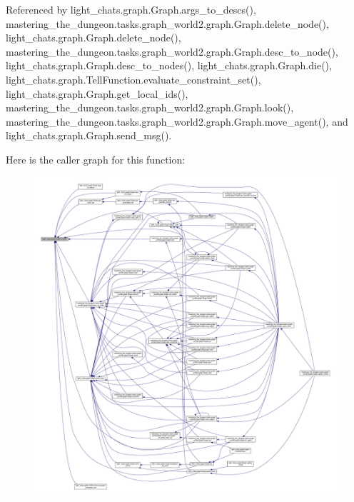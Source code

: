 Referenced by light\+\_\+chats.\+graph.\+Graph.\+args\+\_\+to\+\_\+descs(), mastering\+\_\+the\+\_\+dungeon.\+tasks.\+graph\+\_\+world2.\+graph.\+Graph.\+delete\+\_\+node(), light\+\_\+chats.\+graph.\+Graph.\+delete\+\_\+node(), mastering\+\_\+the\+\_\+dungeon.\+tasks.\+graph\+\_\+world2.\+graph.\+Graph.\+desc\+\_\+to\+\_\+node(), light\+\_\+chats.\+graph.\+Graph.\+desc\+\_\+to\+\_\+nodes(), light\+\_\+chats.\+graph.\+Graph.\+die(), light\+\_\+chats.\+graph.\+Tell\+Function.\+evaluate\+\_\+constraint\+\_\+set(), light\+\_\+chats.\+graph.\+Graph.\+get\+\_\+local\+\_\+ids(), mastering\+\_\+the\+\_\+dungeon.\+tasks.\+graph\+\_\+world2.\+graph.\+Graph.\+look(), mastering\+\_\+the\+\_\+dungeon.\+tasks.\+graph\+\_\+world2.\+graph.\+Graph.\+move\+\_\+agent(), and light\+\_\+chats.\+graph.\+Graph.\+send\+\_\+msg().

Here is the caller graph for this function\+:
\nopagebreak
\begin{figure}[H]
\begin{center}
\leavevmode
\includegraphics[width=350pt]{classlight__chats_1_1graph_1_1Graph_a33bf40491bd3aa15e65987377b3d580f_icgraph}
\end{center}
\end{figure}
\mbox{\label{classlight__chats_1_1graph_1_1Graph_a1e8203ba71f1edd33e989ba4a72d8533}} 
